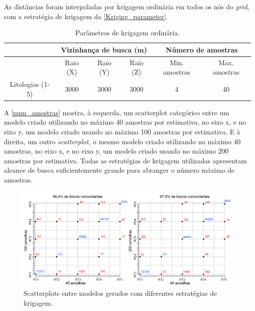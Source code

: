 As distâncias foram interpoladas por krigagem ordinária em todos os nós do \textit{grid}, com a estratégia de krigagem da \autoref{Kriging_parameter}.  

\begin{table}[!htb]
\centering
\caption{Parâmetros de krigagem ordinária.}
\label{Kriging_parameter}
\begin{tabular}{cccccc}
                & \multicolumn{3}{c}{Vizinhança de busca (m)}     & \multicolumn{2}{c}{Número de amostras} \\ \hline
                & Raio (X) & Raio (Y) & Raio (Z) & Min. amostras      & Max. amostras      \\
Litologias (1-5) & 3000      & 3000      & 3000      & 4                 & 40                \\ \hline
\end{tabular}
\end{table}

A \autoref{num_amostras} mostra, à esquerda, um scatterplot categórico entre um modelo criado utilizando no máximo 40 amostras por estimativa, no eixo x, e no eixo y, um modelo criado usando no máximo 100 amostras por estimativa. E à direita, um outro \textit{scatterplot,} o mesmo modelo criado utilizando no máximo 40 amostras, no eixo x, e no eixo y, um modelo criado usando no máximo 200 amostras por estimativa. Todas as estratégias de krigagem utilizadas apresentam alcance de busca suficientemente grande para abranger o número máximo de amostras.

\begin{figure}[H]
	\caption{\label{num_amostras}Scatterplots entre modelos gerados com diferentes estratégias de krigagem.}
	\begin{center}
		\includegraphics[width=\textwidth]{estudo_de_caso/num_amostras}
	\end{center}
\end{figure}

